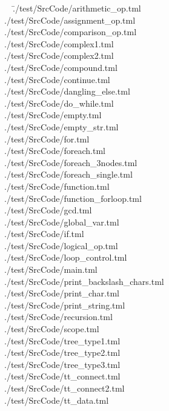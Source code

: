 \documentclass[12pt,psfig,a4]{article}
\begin{document}
\begin{code}
\begin{tabbing}
~~\=./test/SrcCode/arithmetic\_op.tml
\\ \> ./test/SrcCode/assignment\_op.tml
\\ \> ./test/SrcCode/comparison\_op.tml
\\ \> ./test/SrcCode/complex1.tml
\\ \> ./test/SrcCode/complex2.tml
\\ \> ./test/SrcCode/compound.tml
\\ \> ./test/SrcCode/continue.tml
\\ \> ./test/SrcCode/dangling\_else.tml
\\ \> ./test/SrcCode/do\_while.tml
\\ \> ./test/SrcCode/empty.tml
\\ \> ./test/SrcCode/empty\_str.tml
\\ \> ./test/SrcCode/for.tml
\\ \> ./test/SrcCode/foreach.tml
\\ \> ./test/SrcCode/foreach\_3nodes.tml
\\ \> ./test/SrcCode/foreach\_single.tml
\\ \> ./test/SrcCode/function.tml
\\ \> ./test/SrcCode/function\_forloop.tml
\\ \> ./test/SrcCode/gcd.tml
\\ \> ./test/SrcCode/global\_var.tml
\\ \> ./test/SrcCode/if.tml
\\ \> ./test/SrcCode/logical\_op.tml
\\ \> ./test/SrcCode/loop\_control.tml
\\ \> ./test/SrcCode/main.tml
\\ \> ./test/SrcCode/print\_backslash\_chars.tml
\\ \> ./test/SrcCode/print\_char.tml
\\ \> ./test/SrcCode/print\_string.tml
\\ \> ./test/SrcCode/recursion.tml
\\ \> ./test/SrcCode/scope.tml
\\ \> ./test/SrcCode/tree\_type1.tml
\\ \> ./test/SrcCode/tree\_type2.tml
\\ \> ./test/SrcCode/tree\_type3.tml
\\ \> ./test/SrcCode/tt\_connect.tml
\\ \> ./test/SrcCode/tt\_connect2.tml
\\ \> ./test/SrcCode/tt\_data.tml

\end{tabbing}
\end{code}
\end{document}
